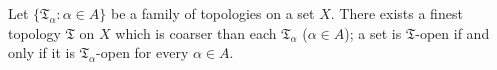 Let $\{\mathfrak{T}_\alpha : \alpha \in A\}$ be a family of topologies on a set $X$. There exists a finest topology $\mathfrak{T}$ on $X$ which is coarser than each $\mathfrak{T}_\alpha$ ($\alpha \in A$); a set is $\mathfrak{T}$-open if and only if it is $\mathfrak{T}_\alpha$-open for every $\alpha \in A$.
